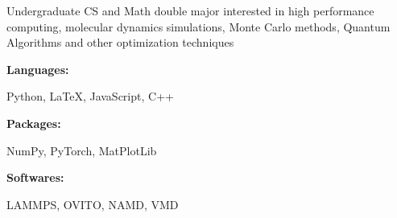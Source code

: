 \documentclass[9pt]{developercv} %
\begin{document}
\begin{minipage}[t]{0.46\textwidth}
	\vspace{-6pt}
	
	Undergraduate CS and Math double major interested in high performance computing, molecular dynamics simulations, Monte Carlo methods, Quantum Algorithms and other optimization techniques\\
\end{minipage}
\hfill %
\begin{minipage}[t]{0.465\textwidth}
    \vspace{-6pt}
    
    \begin{minipage}[t]{0.2\textwidth}
        \textbf{Languages:}
    \end{minipage}
    \hfill
    \begin{minipage}[t]{0.73\textwidth}
      Python, \LaTeX, JavaScript, C++  
    \end{minipage}
    \vspace{4mm}
    
    \begin{minipage}[t]{0.2\textwidth}
        \textbf{Packages:}
    \end{minipage}
    \hfill
    \begin{minipage}[t]{0.73\textwidth}
      NumPy, PyTorch, MatPlotLib
    \end{minipage}
	\vspace{4mm}
	
	\begin{minipage}[t]{0.2\textwidth}
        \textbf{Softwares:}
    \end{minipage}
    \hfill
    \begin{minipage}[t]{0.73\textwidth}
    LAMMPS, OVITO, NAMD, VMD
    \end{minipage}
    \vspace{1mm}
    
    
\end{minipage}
\end{document}
